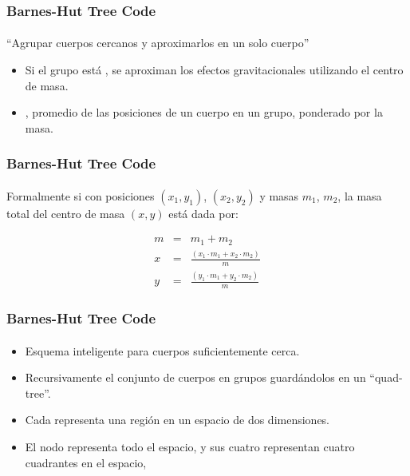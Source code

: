 \frame
{
\frametitle{Barnes-Hut Tree Code}
\framesubtitle{}

\begin{center}
``Agrupar cuerpos cercanos y aproximarlos en un solo cuerpo''
\end{center}

\begin{itemize}
	\item<2-> Si el grupo está , se aproximan los efectos gravitacionales
		 utilizando el centro de masa.
	\item<3-> , promedio de las posiciones de un cuerpo en un grupo,
		 ponderado por la masa.
\end{itemize}
}

\frame
{
\frametitle{Barnes-Hut Tree Code}
\framesubtitle{}


\begin{center}
Formalmente si  con posiciones $(x_{1},y_{1})$, $(x_{2},y_{2})$ y
masas $m_{1}$, $m_{2}$, la masa total del centro de masa $(x,y)$ está dada por:
\end{center}

\begin{eqnarray}
	m &=& m_{1} + m_{2} \nonumber \\
	x &=& \frac{(x_{1}\cdot m_{1} + x_{2}\cdot m_{2})}{m} \nonumber \\
	y &=& \frac{(y_{1}\cdot m_{1} + y_{2}\cdot m_{2})}{m} \nonumber 
\end{eqnarray}

}

\frame
{
\frametitle{Barnes-Hut Tree Code}
\framesubtitle{}

\begin{itemize}
	\item<1-> Esquema inteligente para  cuerpos suficientemente cerca.
	\item<2-> Recursivamente  el conjunto de cuerpos en grupos
	          guardándolos en un ``quad-tree''.
	\item<3-> Cada  representa una región en un espacio de dos dimensiones.
	\item<4-> El nodo  representa todo el espacio,
		y sus cuatro  representan cuatro cuadrantes en el espacio,
\end{itemize}
}

